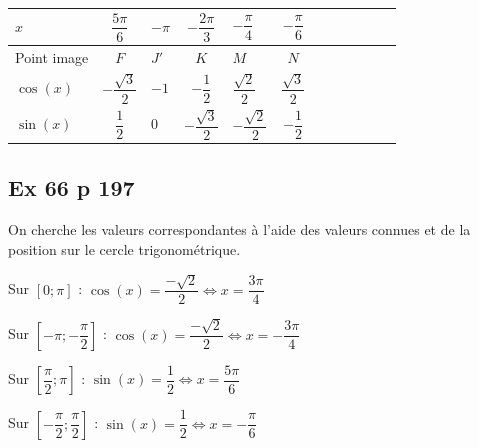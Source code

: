 \documentclass[a4paper,french]{book}
\begin{document}
\begin{tabular}{ | Xc | Xc | Xc | Xc | Xc | Xc |}
    \hline
    $x$  & $\dfrac{5\pi}{6}$ & $-\pi$ & $-\dfrac{2\pi}{3}$ & $-\dfrac{\pi}{4}$ & $-\dfrac{\pi}{6}$ \\ \hline
    Point image  & $F$ & $J'$ & $K$ & $M$ & $N$ \\ \hline
    $\cos(x)$  & $-\dfrac{\sqrt{3}}{2}$ & $-1$ & $-\dfrac{1}{2}$ & $\dfrac{\sqrt{2}}{2}$ & $\dfrac{\sqrt{3}}{2}$ \\ \hline
    $\sin(x)$ & $\dfrac{1}{2}$ & $0$ & $-\dfrac{\sqrt{3}}{2}$ & $-\dfrac{\sqrt{2}}{2}$ & $-\dfrac{1}{2}$ \\
    \hline  
\end{tabular}

\vspace{-.2cm}

\subsection*{Ex 66 p 197}
On cherche les valeurs correspondantes à l'aide des valeurs connues et de la position sur le cercle trigonométrique.
\begin{enumMet}
    \item
    \begin{enumMet}
        \item Sur $\left[0;\pi\right]$ : $\cos(x)=\dfrac{-\sqrt{2}}{2}\iff x=\dfrac{3\pi}{4}$
        \item Sur $\left[-\pi;-\dfrac{\pi}{2}\right]$ : $\cos(x)=\dfrac{-\sqrt{2}}{2}\iff x=-\dfrac{3\pi}{4}$
    \end{enumMet}
    \item
    \begin{enumMet}
        \item Sur $\left[\dfrac{\pi}{2};\pi\right]$ : $\sin(x)=\dfrac{1}{2}\iff x=\dfrac{5\pi}{6}$
        \item Sur $\left[-\dfrac{\pi}{2};\dfrac{\pi}{2}\right]$ : $\sin(x)=\dfrac{1}{2}\iff x=-\dfrac{\pi}{6}$
    \end{enumMet}
\end{enumMet}
\end{document}
